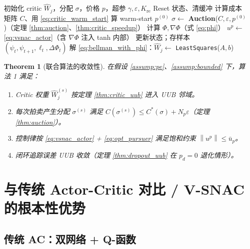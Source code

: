 \documentclass[11pt,a4paper]{article}
\newcommand{\ubar}{\bar{u}}
\newcommand{\norm}[1]{\left\lVert #1 \right\rVert}
\newtheorem{theorem}{Theorem}
\theoremstyle{remark}
\begin{document}
\begin{algorithm}[H]
\caption{V-SNAC + 通信增广 + Critic-Warm-Started Auction}
\begin{algorithmic}[1]
\State 初始化 critic $\hat W_j$，分配 $\sigma$，价格 $p$，超参 $\gamma,\varepsilon,K_{\text{re}}$
  \State Reset 状态、清缓冲
      \State 计算成本矩阵 $C$、用 \eqref{eq:critic_warm_start} 算 warm-start $p^{(0)}$
      \State $\sigma\leftarrow$ \textbf{Auction}($C,\varepsilon,p^{(0)}$)（定理 \ref{thm:auction}、\ref{thm:critic_speedup}）
    \EndIf
    \State 计算 $\Phi,\nabla\Phi$（式 \eqref{eq:phi}）
    \State $u^p\leftarrow$ \eqref{eq:vsnac_actor}（含 $\nabla\Phi$ 注入 tanh 内部）
    \State 更新状态；存样本 $(\psi_t,\psi_{t+1},\ell_t,\Delta\Phi_t)$
  \EndFor
  \State 解 \eqref{eq:bellman_with_phi}：$\hat W_j\leftarrow$ \texttt{LeastSquares}($A,b$)
\EndFor
\end{algorithmic}
\end{algorithm}

\begin{theorem}[联合算法的收敛性]\label{thm:joint}
在假设 \ref{assump:pe}、\ref{assump:bounded} 下，算法 1 满足：
\begin{enumerate}
\item Critic 权重 $\hat W_j^{(s)}$ 按定理 \ref{thm:critic_uub} 进入 UUB 邻域。
\item 每次拍卖产生分配 $\sigma^{(s)}$ 满足 $C(\sigma^{(s)})\le C^*(\sigma)+N_p\varepsilon$（定理 \ref{thm:auction}）。
\item 控制律按 \eqref{eq:vsnac_actor} + \eqref{eq:opt_pursuer} 满足饱和约束 $\norm{u^p}\le\ubar_p$。
\item 闭环追踪误差 UUB 收敛（定理 \ref{thm:dropout_uub} 在 $p_d=0$ 退化情形）。
\end{enumerate}
\end{theorem}

\section{与传统 Actor-Critic 对比 / V-SNAC 的根本性优势}

\subsection{传统 AC：双网络 + Q-函数}
\end{document}
